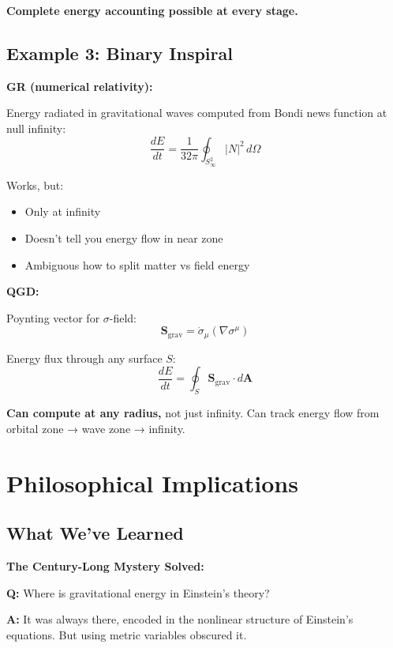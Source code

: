 \documentclass[11pt,a4paper]{article}
\theoremstyle{definition}
\theoremstyle{remark}
\begin{document}
	\textbf{Complete energy accounting possible at every stage.}
	
	\subsection{Example 3: Binary Inspiral}
	
	\textbf{GR (numerical relativity):}
	
	Energy radiated in gravitational waves computed from Bondi news function at null infinity:
	\begin{equation}
		\frac{dE}{dt} = \frac{1}{32\pi}\oint_{S^2_\infty}|N|^2\,d\Omega
	\end{equation}
	
	Works, but:
	\begin{itemize}
		\item Only at infinity
		\item Doesn't tell you energy flow in near zone
		\item Ambiguous how to split matter vs field energy
	\end{itemize}
	
	\textbf{QGD:}
	
	Poynting vector for $\sigma$-field:
	\begin{equation}
		\mathbf{S}_{\text{grav}} = \dot{\sigma}_\mu(\nabla\sigma^\mu)
	\end{equation}
	
	Energy flux through any surface $S$:
	\begin{equation}
		\frac{dE}{dt} = \oint_S \mathbf{S}_{\text{grav}} \cdot d\mathbf{A}
	\end{equation}
	
	\textbf{Can compute at any radius,} not just infinity. Can track energy flow from orbital zone → wave zone → infinity.
	
	\section{Philosophical Implications}
	
	\subsection{What We've Learned}
	
		\textbf{The Century-Long Mystery Solved:}
		
		\textbf{Q:} Where is gravitational energy in Einstein's theory?
		
		\textbf{A:} It was always there, encoded in the nonlinear structure of Einstein's equations. But using metric variables obscured it.
		
\end{document}
